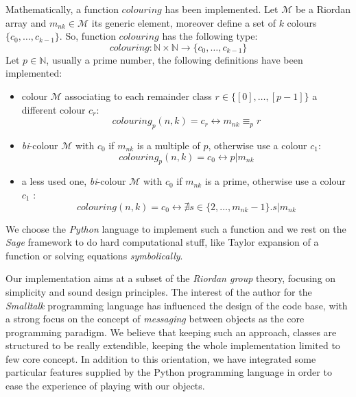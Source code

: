 Mathematically, a function $colouring$ has been implemented. Let $\mathcal{M}$
be a Riordan array and $m_{nk} \in \mathcal{M}$ its generic element, moreover
define a set of $k$ colours $\lbrace c_0, \ldots, c_{k-1} \rbrace$. So,
function $colouring$ has the following type: 
\begin{displaymath} 
    colouring : \mathbb{N} \times\mathbb{N} \rightarrow \lbrace c_0, \ldots, c_{k-1} \rbrace
\end{displaymath}
Let $p\in\mathbb{N}$, usually a prime number, the following definitions have been implemented:
\begin{itemize}
    \item colour $\mathcal{M}$ associating to each remainder class 
        $r \in \lbrace[0],\ldots,[p-1]\rbrace$ a different colour $c_r$:
        \begin{displaymath}
            colouring_{p}(n,k) = c_{r} \leftrightarrow m_{nk} \equiv_{p} r
        \end{displaymath}
    \item \emph{bi}-colour $\mathcal{M}$ with $c_0$ if $m_{nk}$ 
        is a multiple of $p$, otherwise use a colour $c_1$:
        \begin{displaymath}
            colouring_{p}(n,k) = c_{0} \leftrightarrow p | m_{nk}
        \end{displaymath}
    \item a less used one, \emph{bi}-colour $\mathcal{M}$ with $c_0$ 
        if $m_{nk}$ is a prime, otherwise use a colour $c_1$
            :
        \begin{displaymath}
            colouring(n,k) = c_{0} \leftrightarrow 
                \nexists s\in\lbrace 2,\ldots,m_{nk}-1\rbrace.s|m_{nk} 
        \end{displaymath}
\end{itemize}

We choose the \emph{Python} language to implement such a function and we rest
on the \emph{Sage} \cite{sage} framework to do hard computational stuff, like
Taylor expansion of a function or solving equations \emph{symbolically}.

Our implementation aims at a subset of the \emph{Riordan group} theory,
focusing on simplicity and sound design principles. The interest of the author
for the \emph{Smalltalk} programming language \cite{Goldberg:1983:SLI:273} has
    influenced the design of the code base, with a strong focus on the concept
    of \emph{messaging} between objects as the core programming paradigm. We
    believe that keeping such an approach, classes are structured to be really
    extendible, keeping the whole implementation limited to few core concept.
    In addition to this orientation, we have integrated some particular
    features supplied by the Python programming language in order to ease the
    experience of playing with our objects.

